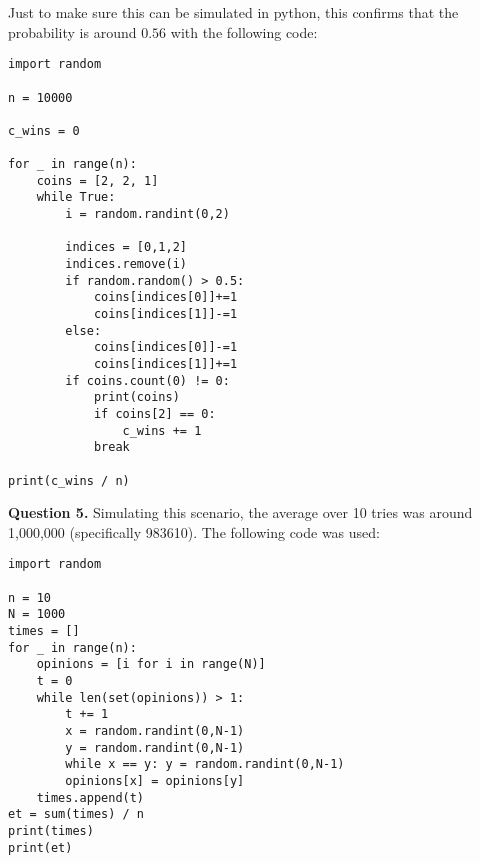 \documentclass[letterpaper, reqno,11pt]{article}
\begin{document}
Just to make sure this can be simulated in python, this confirms that the probability is around $0.56$ with the following code:
\begin{lstlisting}
import random

n = 10000

c_wins = 0

for _ in range(n):
    coins = [2, 2, 1]
    while True:
        i = random.randint(0,2)

        indices = [0,1,2]
        indices.remove(i)
        if random.random() > 0.5:
            coins[indices[0]]+=1
            coins[indices[1]]-=1
        else:
            coins[indices[0]]-=1
            coins[indices[1]]+=1
        if coins.count(0) != 0:
            print(coins)
            if coins[2] == 0:
                c_wins += 1
            break

print(c_wins / n)
\end{lstlisting}

{\medskip\noindent\bf Question 5.} Simulating this scenario, the average over 10 tries was around 1,000,000 (specifically 983610). The following code was used:
\begin{lstlisting}
import random

n = 10
N = 1000
times = []
for _ in range(n):
    opinions = [i for i in range(N)]
    t = 0
    while len(set(opinions)) > 1:
        t += 1
        x = random.randint(0,N-1)
        y = random.randint(0,N-1)
        while x == y: y = random.randint(0,N-1)
        opinions[x] = opinions[y]
    times.append(t)
et = sum(times) / n
print(times)
print(et)
\end{lstlisting}
\end{document}
